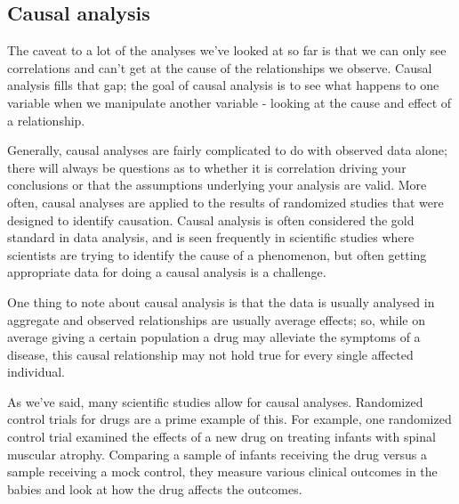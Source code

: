 \documentclass[11pt,fancy]{elegantbook}
\begin{document}
\subsection{Causal analysis}
The caveat to a lot of the analyses we've looked at so far is that we can only see correlations and can't get at the cause of the relationships we observe. Causal analysis fills that gap; the goal of causal analysis is to see what happens to one variable when we manipulate another variable - looking at the cause and effect of a relationship.
\par Generally, causal analyses are fairly complicated to do with observed data alone; there will always be questions as to whether it is correlation driving your conclusions or that the assumptions underlying your analysis are valid. More often, causal analyses are applied to the results of randomized studies that were designed to identify causation. Causal analysis is often considered the gold standard in data analysis, and is seen frequently in scientific studies where scientists are trying to identify the cause of a phenomenon, but often getting appropriate data for doing a causal analysis is a challenge.
\par One thing to note about causal analysis is that the data is usually analysed in aggregate and observed relationships are usually average effects; so, while on average giving a certain population a drug may alleviate the symptoms of a disease, this causal relationship may not hold true for every single affected individual.
\par As we've said, many scientific studies allow for causal analyses. Randomized control trials for drugs are a prime example of this. For example, one randomized control trial examined the effects of a new drug on treating infants with spinal muscular atrophy. Comparing a sample of infants receiving the drug versus a sample receiving a mock control, they measure various clinical outcomes in the babies and look at how the drug affects the outcomes.
\end{document}
